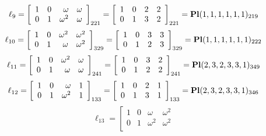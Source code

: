 \documentclass{article}
\begin{document}
{$$
\ell_{9} = 
\left[
\begin{array}{*{4}{r}}
1 & 0 & \omega  & \omega \\
0 & 1 & \omega^{2} & \omega \\
\end{array}
\right]
_{221}
=
\left[
\begin{array}{*{4}c}
1  & 0  & 2  & 2\\
0  & 1  & 3  & 2\\
\end{array}
\right]_{221}
={\rm\bf Pl}(1,1,1,1,1,1 )_{219}$$
$$
\ell_{10} = 
\left[
\begin{array}{*{4}{r}}
1 & 0 & \omega^{2} & \omega^{2}\\
0 & 1 & \omega  & \omega^{2}\\
\end{array}
\right]
_{329}
=
\left[
\begin{array}{*{4}c}
1  & 0  & 3  & 3\\
0  & 1  & 2  & 3\\
\end{array}
\right]_{329}
={\rm\bf Pl}(1,1,1,1,1,1 )_{222}$$
$$
\ell_{11} = 
\left[
\begin{array}{*{4}{r}}
1 & 0 & \omega^{2} & \omega \\
0 & 1 & \omega  & \omega \\
\end{array}
\right]
_{241}
=
\left[
\begin{array}{*{4}c}
1  & 0  & 3  & 2\\
0  & 1  & 2  & 2\\
\end{array}
\right]_{241}
={\rm\bf Pl}(2,3,2,3,3,1 )_{349}$$
$$
\ell_{12} = 
\left[
\begin{array}{*{4}{r}}
1 & 0 & \omega  & 1\\
0 & 1 & \omega^{2} & 1\\
\end{array}
\right]
_{133}
=
\left[
\begin{array}{*{4}c}
1  & 0  & 2  & 1\\
0  & 1  & 3  & 1\\
\end{array}
\right]_{133}
={\rm\bf Pl}(2,3,2,3,3,1 )_{346}$$
$$
\ell_{13} = 
\left[
\begin{array}{*{4}{r}}
1 & 0 & \omega  & \omega^{2}\\
0 & 1 & \omega^{2} & \omega^{2}\\
\end{array}
$$}
\end{document}
